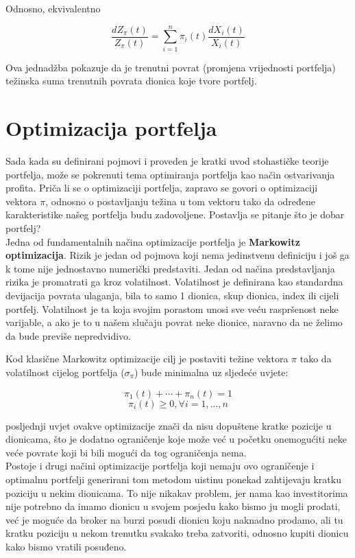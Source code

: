 \documentclass[times, utf8, seminar]{fer}
\begin{document}
Odnosno, ekvivalentno

    \[ \frac{dZ_{\pi}(t)}{Z_{\pi}(t)} = \sum_{i=1}^{n} \pi_i(t)\frac{dX_i(t)}{X_i(t)} \]

Ova jednadžba pokazuje da je trenutni povrat (promjena vrijednosti portfelja) težinska suma trenutnih povrata dionica koje tvore portfelj.

\section{Optimizacija portfelja}
Sada kada su definirani pojmovi i proveden je kratki uvod stohastičke teorije portfelja, može se pokrenuti tema optimiranja portfelja kao način ostvarivanja profita. Priča li se o optimizaciji portfelja, zapravo se govori o optimizaciji vektora $\pi$, odnosno o postavljanju težina u tom vektoru tako da određene karakteristike našeg portfelja budu zadovoljene. Postavlja se pitanje što je dobar portfelj? \\

Jedna od fundamentalnih načina optimizacije portfelja je \textbf{Markowitz optimizacija}. Rizik je jedan od pojmova koji nema jedinstvenu definiciju i još ga k tome nije jednostavno numerički predstaviti. Jedan od načina predstavljanja rizika je promatrati ga kroz volatilnost. Volatilnost je definirana kao standardna devijacija povrata ulaganja, bila to samo 1 dionica, skup dionica, index ili cijeli portfelj. Volatilnost je ta koja svojim porastom unosi sve veću raspršenost neke varijable, a ako je to u našem slučaju povrat neke dionice, naravno da ne želimo da bude previše nepredvidivo.

Kod klasične Markowitz optimizacije cilj je postaviti težine vektora $\pi$ tako da volatilnost cijelog portfelja ($\sigma_{\pi}$) bude minimalna uz sljedeće uvjete:

\[ \pi_1(t) + \cdots + \pi_n(t) = 1 \]
\[ \pi_i(t) \geq 0, \forall i = 1,...,n \]

posljednji uvjet ovakve optimizacije znači da nisu dopuštene kratke pozicije u dionicama, što je dodatno ograničenje koje može već u početku onemogućiti neke veće povrate koji bi bili mogući da tog ograničenja nema. \\

Postoje i drugi načini optimizacije portfelja koji nemaju ovo ograničenje i optimalnu portfelji generirani tom metodom uistinu ponekad zahtijevaju kratku poziciju u nekim dionicama. To nije nikakav problem, jer nama kao investitorima nije potrebno da imamo dionicu u svojem posjedu kako bismo ju mogli prodati, već je moguće da broker na burzi posudi dionicu koju naknadno prodamo, ali tu kratku poziciju u nekom trenutku svakako treba zatvoriti, odnosno kupiti dionicu kako bismo vratili posuđeno.
\end{document}
